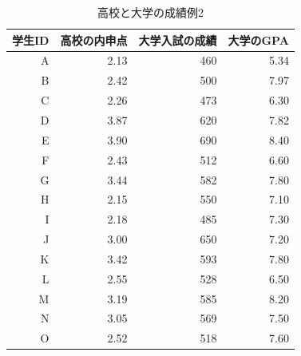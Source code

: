 \begin{table}[ht]
	\caption{高校と大学の成績例2}
	\centering
	\begin{tabular}[t]{rrrr}
		\hline
		学生ID & 高校の内申点 & 大学入試の成績 & 大学のGPA \\\hline
		\hline
		A    & 2.13   & 460     & 5.34   \\
		B    & 2.42   & 500     & 7.97   \\
		C    & 2.26   & 473     & 6.30   \\
		D    & 3.87   & 620     & 7.82   \\
		E    & 3.90   & 690     & 8.40   \\
		F    & 2.43   & 512     & 6.60   \\
		G    & 3.44   & 582     & 7.80   \\
		H    & 2.15   & 550     & 7.10   \\
		I    & 2.18   & 485     & 7.30   \\
		J    & 3.00   & 650     & 7.20   \\
		K    & 3.42   & 593     & 7.80   \\
		L    & 2.55   & 528     & 6.50   \\
		M    & 3.19   & 585     & 8.20   \\
		N    & 3.05   & 569     & 7.50   \\
		O    & 2.52   & 518     & 7.60   \\
		\hline
	\end{tabular}
	\label{tbl::10_01}
\end{table}
